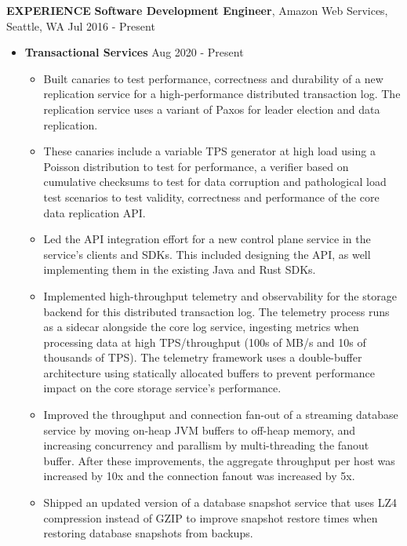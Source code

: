 \documentclass[10pt, letterpaper]{article}
\begin{document}
\textbf{EXPERIENCE}
\smallskip
\newline
\textbf{Software Development Engineer}, Amazon Web Services, Seattle, WA \hfill Jul 2016 - Present
\begin{itemize}
\item \textbf{Transactional Services} \hfill Aug 2020 - Present
  \begin{itemize}[label=$\bullet$]
    \item Built canaries to test performance, correctness and durability of a new replication service for a high-performance 
      distributed transaction log. The replication service uses a variant of Paxos for leader election and data replication.
    \item These canaries include a variable TPS generator at high load using a Poisson distribution to
      test for performance, a verifier based on cumulative checksums to test for data corruption and pathological load test
      scenarios to test validity, correctness and performance of the core data replication API.
    \item Led the API integration effort for a new control plane service in the service's clients and SDKs. This included designing
      the API, as well implementing them in the existing Java and Rust SDKs.
    \item Implemented high-throughput telemetry and observability for the storage backend for this distributed transaction log.
      The telemetry process runs as a sidecar alongside the core log service, ingesting metrics when processing data at 
      high TPS/throughput (100s of MB/s and 10s of thousands of TPS). The telemetry framework uses a double-buffer architecture 
      using statically allocated buffers to prevent performance impact on the core storage service's performance.
    \item Improved the throughput and connection fan-out of a streaming database service by moving on-heap JVM buffers 
      to off-heap memory, and increasing concurrency and parallism by multi-threading the fanout buffer. 
      After these improvements, the aggregate throughput per host was increased by 10x and the connection fanout was increased by 5x.
    \item Shipped an updated version of a database snapshot service that uses LZ4 compression instead of GZIP to improve
      snapshot restore times when restoring database snapshots from backups. 

\end{itemize}
\end{itemize}
\end{document}
